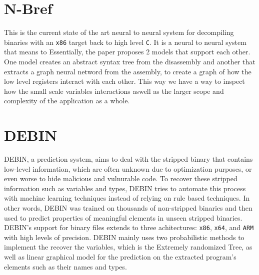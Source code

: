 \documentclass{article}
\begin{document}
\section{N-Bref}

This is the current state of the art neural to neural system for decompiling binaries with an \verb|x86| target back to high level \verb|C|.
It is a neural to neural system that means to 
Essentially, the paper proposes 2 models that support each other.
One model creates an abstract syntax tree from the disassembly and another that extracts a graph neural netword from the assembly, to create a graph of how the low level registers interact with each other.
This way we have a way to inspect how the small scale variables interactions aswell as the larger scope and complexity of the application as a whole.

\section{DEBIN}

DEBIN, a prediction system, aims to deal with the stripped binary that contains low-level information, which are often unknown due to optimization purposes, or even worse to hide malicious and vulnurable code.
To recover these stripped information such as variables and types, DEBIN tries to automate this process with machine learning techniques instead of relying on rule based techniques. In other words, DEBIN was trained on thousands of non-stripped binaries and then used to predict properties of meaningful elements in unseen stripped binaries. 
DEBIN's support for binary files extends to three achitectures: \verb|x86|, \verb|x64|, and \verb|ARM| with high levels of precision.
DEBIN mainly uses two probabilistic methods to implement the recover the variables, which is the Extremely randomized Tree, as well as linear graphical model for the prediction on the extracted program's elements such as their names and types.\\
\end{document}
